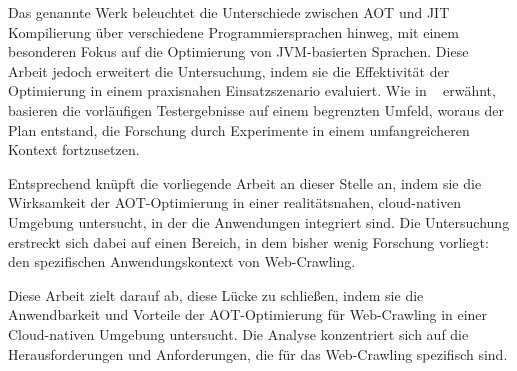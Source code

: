Das genannte Werk beleuchtet die Unterschiede zwischen \ac{AOT} und \ac{JIT} Kompilierung über verschiedene Programmiersprachen hinweg, mit einem besonderen Fokus auf die Optimierung von \ac{JVM}-basierten Sprachen. Diese Arbeit jedoch erweitert die Untersuchung, indem sie die Effektivität der Optimierung in einem praxisnahen Einsatzszenario evaluiert. Wie in ~\parencite[vgl.][]{8756917} erwähnt, basieren die vorläufigen Testergebnisse auf einem begrenzten Umfeld, woraus der Plan entstand, die Forschung durch Experimente in einem umfangreicheren Kontext fortzusetzen.

Entsprechend knüpft die vorliegende Arbeit an dieser Stelle an, indem sie die Wirksamkeit der AOT-Optimierung in einer realitätsnahen, cloud-nativen Umgebung untersucht, in der die Anwendungen integriert sind. Die Untersuchung erstreckt sich dabei auf einen Bereich, in dem bisher wenig Forschung vorliegt: den spezifischen Anwendungskontext von Web-Crawling.

Diese Arbeit zielt darauf ab, diese Lücke zu schließen, indem sie die Anwendbarkeit und Vorteile der \ac{AOT}-Optimierung für Web-Crawling in einer Cloud-nativen Umgebung untersucht. Die Analyse konzentriert sich auf die Herausforderungen und Anforderungen, die für das Web-Crawling spezifisch sind. 

\vfill

\chapterend